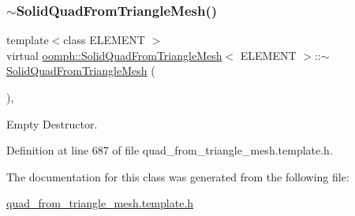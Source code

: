 \subsubsection{\texorpdfstring{$\sim$\+Solid\+Quad\+From\+Triangle\+Mesh()}{~SolidQuadFromTriangleMesh()}}
{\footnotesize\ttfamily template$<$class E\+L\+E\+M\+E\+NT $>$ \\
virtual \hyperlink{classoomph_1_1SolidQuadFromTriangleMesh}{oomph\+::\+Solid\+Quad\+From\+Triangle\+Mesh}$<$ E\+L\+E\+M\+E\+NT $>$\+::$\sim$\hyperlink{classoomph_1_1SolidQuadFromTriangleMesh}{Solid\+Quad\+From\+Triangle\+Mesh} (\begin{DoxyParamCaption}{ }\end{DoxyParamCaption})\hspace{0.3cm}{\ttfamily [inline]}, {\ttfamily [virtual]}}



Empty Destructor. 



Definition at line 687 of file quad\+\_\+from\+\_\+triangle\+\_\+mesh.\+template.\+h.



The documentation for this class was generated from the following file\+:\begin{DoxyCompactItemize}
\item 
\hyperlink{quad__from__triangle__mesh_8template_8h}{quad\+\_\+from\+\_\+triangle\+\_\+mesh.\+template.\+h}\end{DoxyCompactItemize}
